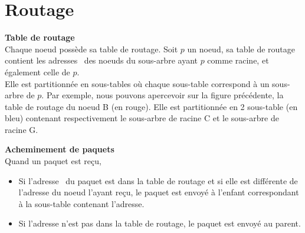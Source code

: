         \section{Routage}
            \textbf{Table de routage}\\
                Chaque noeud possède sa table de routage. Soit $p$ un noeud, sa table de routage contient les adresses \mac\ 
                des noeuds du sous-arbre ayant $p$ comme racine, et également celle de $p$.\\
                Elle est partitionnée en sous-tables où chaque sous-table correspond à un sous-arbre de $p$.
                Par exemple, nous pouvons apercevoir sur la figure précédente, la table de routage du noeud B (en rouge).
                Elle est partitionnée en 2 sous-table (en bleu) contenant respectivement le sous-arbre de racine C et le sous-arbre de racine G.
            \newline


            \textbf{Acheminement de paquets}\\
                Quand un paquet est reçu,
                \begin{itemize}
                    \item Si l'adresse \mac\ du paquet est dans la table de routage et si elle est différente de l'adresse du noeud l'ayant reçu, le paquet est envoyé
                    à l'enfant correspondant à la sous-table contenant l'adresse.
                    \item Si l'adresse n'est pas dans la table de routage, le paquet est envoyé au parent.
                \end{itemize}


